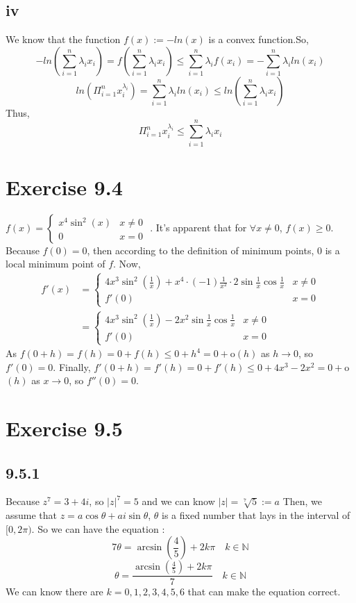 \documentclass[11pt,twoside,a4paper]{article}
\begin{document}
\subsection{iv}
We know that the function $f\left(x\right) := -ln(x)$ is a convex function.So,
$$
-ln\left(\sum_{i=1}^{n} \lambda_{i}x_{i}\right) = f\left(\sum_{i=1}^{n} \lambda_{i}x_{i}\right) \leq  \sum_{i=1}^{n} \lambda_{i} f\left(x_{i}\right) = - \sum_{i=1}^{n} \lambda_{i} ln\left(x_{i}\right)
$$
$$
ln\left(\Pi_{i=1}^{n} x_{i}^{\lambda_{i}}\right)=\sum_{i=1}^{n} \lambda_{i} ln\left(x_{i}\right) \leq ln\left(\sum_{i=1}^{n} \lambda_{i}x_{i}\right)
$$
Thus,
$$
\Pi_{i=1}^{n} x_{i}^{\lambda_{i}} \leq \sum_{i=1}^{n} \lambda_{i}x_{i}
$$


\section{Exercise 9.4}
$f(x)=\begin{cases}x^4\sin^2 (x)&x\neq 0\\0&x=0\end{cases}$ . 
\newline
It's apparent that for $\forall x\neq 0$, $f(x)\geq 0$. Because $f(0)=0$, then according to the definition of minimum points, 0 is a local minimum point of $f$.
\newline\newline
Now,\begin{align*}f'(x)&=\begin{cases}4x^3 \sin^2 (\frac{1}{x})+x^4\cdot (-1)\frac{1}{x^2}\cdot 2\sin\frac{1}{x}\cos\frac{1}{x}&x\neq 0\\f'(0)&x=0\end{cases}\\&=\begin{cases}4x^3\sin^2 (\frac{1}{x})-2x^2\sin\frac{1}{x}\cos\frac{1}{x}&x\neq 0\\f'(0)&x=0\end{cases}\end{align*}
As $f(0+h)=f(h)=0+f(h)\leq 0+h^4=0+$o$(h)$ as $h\rightarrow 0$, so $f'(0)=0$.
\newline\newline
Finally, $f'(0+h)=f'(h)=0+f'(h)\leq 0+4x^3 -2x^2 =0+$o$(h)$ as $x\rightarrow 0$, so $f''(0)=0$.
\section{Exercise 9.5}
\subsection{9.5.1}
Because $z^7=3+4i$, so $|z|^7=5$ and we can know $|z|=\sqrt[7]{5}:=a $
Then, we assume that\newline
$z=a\cos \theta +a i \sin \theta $, $\theta $ is a fixed number that lays in
the interval of $[0,2\pi)$. So we can have the equation :
$$7\theta =\arcsin (\frac{4}{5})+2k\pi \quad k\in \mathbb{N}$$
$$\theta =\frac{\arcsin (\frac{4}{5})+2k\pi}{7} \quad k\in \mathbb{N}$$
We can know there are $k=0,1,2,3,4,5,6$ that can make the equation
correct.
\end{document}
